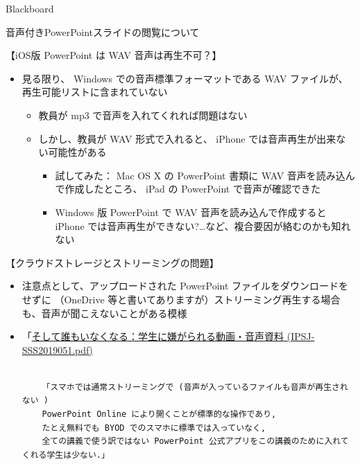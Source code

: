 \documentclass[a4j,10pt]{jsarticle}
\begin{document}
{\begin{frame}[label={sec:org166405d},fragile]{Blackboard}
\begin{block}{音声付きPowerPointスライドの閲覧について}
\begin{block}{【iOS版 PowerPoint は WAV 音声は再生不可？】}
\begin{itemize}
\begin{itemize}
\item \href{https://support.microsoft.com/en-us/office/video-and-audio-file-formats-supported-in-powerpoint-d8b12450-26db-4c7b-a5c1-593d3418fb59}{Video and audio file formats supported in PowerPoint - Office Support}
\item \href{https://support.microsoft.com/en-us/office/file-formats-that-are-supported-in-powerpoint-252c6fa0-a4bc-41be-ac82-b77c9773f9dc}{File formats that are supported in PowerPoint - Office Support}
\end{itemize}
\par
\item 見る限り、 Windows での音声標準フォーマットである WAV ファイルが、再生可能リストに含まれていない
\begin{itemize}
\item 教員が mp3 で音声を入れてくれれば問題はない
\item しかし、教員が WAV 形式で入れると、 iPhone では音声再生が出来ない可能性がある
\begin{itemize}
\item 試してみた： Mac OS X の PowerPoint 書類に WAV 音声を読み込んで作成したところ、 iPad の PowerPoint で音声が確認できた
\item Windows 版 PowerPoint で WAV 音声を読み込んで作成すると iPhone では音声再生ができない?\ldots{}など、複合要因が絡むのかも知れない
\end{itemize}
\end{itemize}
\end{itemize}
\end{block}
\par
\begin{block}{【クラウドストレージとストリーミングの問題】}
\begin{itemize}
\item 注意点として、アップロードされた PowerPoint ファイルをダウンロードをせずに
（OneDrive 等と書いてありますが）ストリーミング再生する場合も、音声が聞こえないことがある模様
\item 「\href{https://ipsj.ixsq.nii.ac.jp/ej/?action=repository\_uri\&item\_id=198673\&file\_id=1\&file\_no=1}{そして誰もいなくなる：学生に嫌がられる動画・音声資料 (IPSJ-SSS2019051.pdf)}
\begin{verbatim}

    「スマホでは通常ストリーミングで (音声が入っているファイルも音声が再生されない )
    PowerPoint Online により開くことが標準的な操作であり,
    たとえ無料でも BYOD でのスマホに標準では入っていなく,
    全ての講義で使う訳ではない PowerPoint 公式アプリをこの講義のために入れてくれる学生は少ない.」\end{verbatim}


\end{itemize}
\end{block}
\end{block}
\end{frame}}
\end{document}
